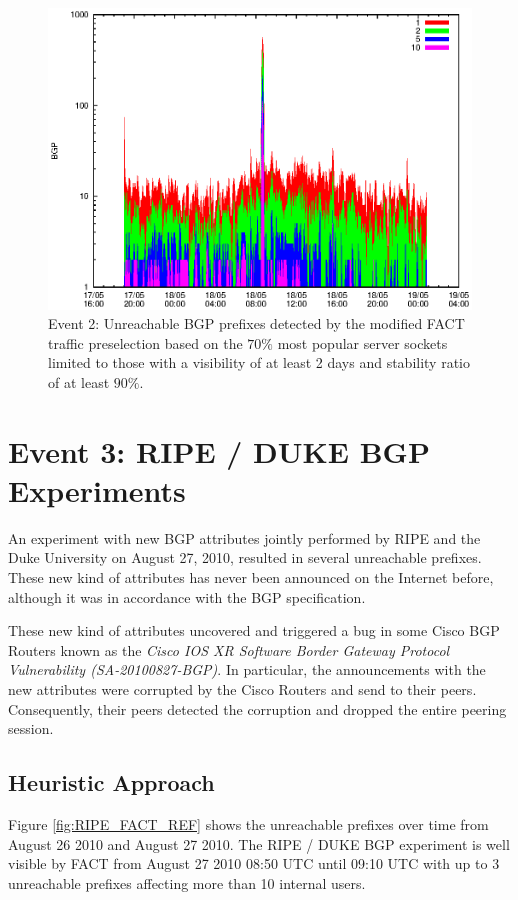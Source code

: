 \begin{figure}
	[p] \centering 
	\includegraphics[width=0.75\linewidth]{images/events/2010_05_18/bgp_log_Set_var_0_1_stab_9_vts_2.eps} \caption{Event 2: Unreachable BGP prefixes detected by the modified FACT traffic preselection based on the $70\%$ most popular server sockets limited to those with a visibility of at least 2 days and stability ratio of at least $90\%$.} 
	\label{fig:TIER1_FACT_popularVTS2STAB9} 
\end{figure}

\newpage 
\section{Event 3: RIPE / DUKE BGP Experiments}

An experiment with new BGP attributes jointly performed by RIPE and the Duke 
University on August 27, 2010, resulted in several unreachable 
prefixes\citep{SchatzmannPAM2011}. These new kind of attributes has never been 
announced on the Internet before, although it was in accordance with the BGP 
specification\citep{ripe_duke}.

These new kind of attributes uncovered and triggered a bug in some Cisco BGP 
Routers known as the \emph{Cisco IOS XR Software Border Gateway Protocol 
Vulnerability (SA-20100827-BGP)}\citep{cisco_vulnerability}. In particular, the 
announcements with the new attributes were corrupted by the Cisco Routers and 
send to their peers. Consequently, their peers detected the corruption and 
dropped the entire peering session\citep{ripe_duke}.

\subsection{Heuristic Approach} 
Figure \ref{fig:RIPE_FACT_REF} shows the unreachable prefixes over time from 
August 26 2010 and August 27 2010. The RIPE / DUKE BGP experiment is well 
visible by FACT from August 27 2010 08:50 UTC until 09:10 UTC with up to 3 
unreachable prefixes affecting more than 10 internal users. 

